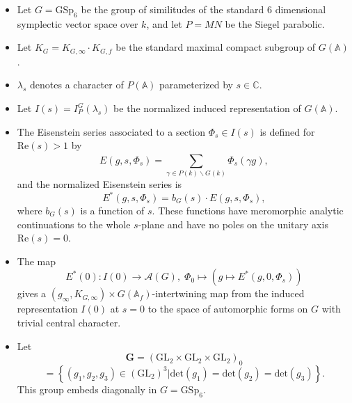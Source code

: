 \documentclass[12pt]{article}
\begin{document}
\begin{itemize}
    
\item Let $G = \text{GSp}_{6}$ be the group of similitudes of the standard $6$
dimensional symplectic vector space over $k$, and let $P = MN$ be the Siegel
parabolic.

\item Let $K_{G} = K_{G, \infty} \cdot K_{G, f}$ be the standard maximal compact
subgroup of $G\left(\mathbb{A}\right)$.

\item $\lambda_{s}$ denotes a character of $P\left(\mathbb{A}\right)$
parameterized by $s \in \mathbb{C}$.

\item Let $I\left(s\right) = I_{P}^{G}\left(\lambda_{s}\right)$ be the
normalized induced representation of $G\left(\mathbb{A}\right)$.

\item The Eisenstein series associated to a section $\Phi_{s} \in
I\left(s\right)$ is defined for $\text{Re}\left(s\right) > 1$ by 
%
\[E\left(g, s, \Phi_{s}\right) = \sum_{\gamma \in P\left(k\right) \backslash
G\left(k\right)}^{}  \Phi_{s}\left(\gamma g\right),\]
%
and the normalized Eisenstein series is 
%
\[E^{*}\left(g, s, \Phi_{s}\right) = b_{G}\left(s\right) \cdot E\left(g, s,
\Phi_{s}\right),\]
%
where $b_{G}\left(s\right)$ is a function of $s$. These functions have
meromorphic analytic continuations to the whole $s$-plane and have no poles on
the unitary axis $\text{Re}\left(s\right) = 0$.

\item The map 
%
\[E^{*}\left(0\right) : I\left(0\right) \rightarrow \mathcal{A}\left(G\right),
\; \Phi_{0} \mapsto \left(g \mapsto E^{*}\left(g, 0, \Phi_{s}\right)\right)\]
%
gives a $\left(g_{\infty}, K_{G,\infty}\right) \times
G\left(\mathbb{A}_{f}\right)$-intertwining map from the induced representation
$I\left(0\right)$ at $s = 0$ to the space of automorphic forms on $G$ with
trivial central character.

\item Let 
%
\[\textbf{G} = \left(\text{GL}_{2} \times \text{GL}_{2} \times
\text{GL}_{2}\right)_{0}\]
%
\[= \left\{\left(g_1, g_2, g_3\right) \in \left(\text{GL}_{2}\right)^{3} |
\text{det}\left(g_1\right) = \text{det}\left(g_2\right) =
\text{det}\left(g_3\right)\right\}.\]
%
This group embeds diagonally in $G = \text{GSp}_{6}$.


\end{itemize}
\end{document}
